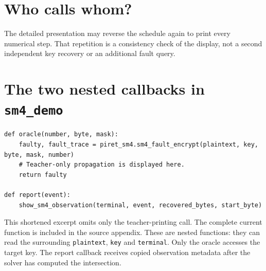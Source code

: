 \documentclass[11pt,a4paper]{report}
\begin{document}
\section{Who calls whom?}
\begin{center}
\end{center}
The detailed presentation may reverse the schedule again to print every numerical step. That repetition is a consistency check of the display, not a second independent key recovery or an additional fault query.

\section{The two nested callbacks in \texttt{sm4\_demo}}
\begin{Verbatim}
def oracle(number, byte, mask):
    faulty, fault_trace = piret_sm4.sm4_fault_encrypt(plaintext, key, byte, mask, number)
    # Teacher-only propagation is displayed here.
    return faulty

def report(event):
    show_sm4_observation(terminal, event, recovered_bytes, start_byte)
\end{Verbatim}
This shortened excerpt omits only the teacher-printing call. The complete current function is included in the source appendix. These are nested functions: they can read the surrounding \texttt{plaintext}, \texttt{key} and \texttt{terminal}. Only the oracle accesses the target key. The report callback receives copied observation metadata after the solver has computed the intersection.
\end{document}
